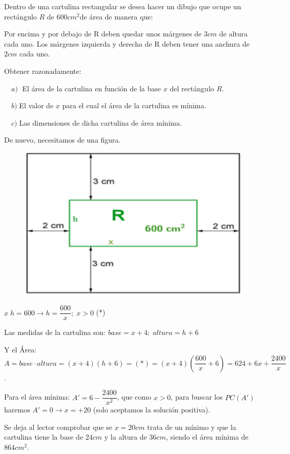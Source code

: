 	\begin{ejre} Dentro de una cartulina rectangular se desea hacer un dibujo que ocupe un rectángulo $R$ de $600 cm^2$de área de manera que:
	

		Por encima y por debajo de R deben quedar unos márgenes de $3 cm$ de altura cada uno. Los márgenes izquierda y derecha de R deben tener una anchura de $2 cm$ cada uno.
		
	Obtener razonadamente:
	
	
 	$\quad a)\; $ El área de la cartulina en función de la base $x$ del rectángulo $R$.
 	
 
 	 
 	 $\quad b)\; $El valor de $x$ para el cual el área de la cartulina es mínima. 
 	
 	$\quad c)\; $Las dimensiones de dicha cartulina de área mínima.
	 
	 
	  	
	\end{ejre}

	\begin{proofw}\renewcommand{\qedsymbol}{$\diamond$}
	
	De nuevo, necesitamos de una figura.
	
	\begin{multicols}{2}
	\begin{figure}[H]
	\centering
	\includegraphics[width=.4\textwidth]{imagenes/imagenes05/T05IM22.png}
	\end{figure}
	
	$x\; h=600 \to h=\dfrac {600} x; \; x>0$ (*)
	
	Las medidas de la cartulina son: $base=x+4; \; altura=h+6$
	
	Y el Área: $A=base\cdot altura= (x+4)(h+6)=(*)=(x+4)\left(\dfrac {600}{x}+6\right)= 624+6x+\dfrac {2400}{x}$.
	
		
	\end{multicols}

	Para el área mínima: $A'= 6-\dfrac{2400}{x^2}$, que como $x>0$, para buscar los $PC(A')$ haremos $A'=0 \to x=+20$ (solo aceptamos la solución positiva).
	
	Se deja al lector comprobar que se $x=20cm$ trata de un mínimo y que la cartulina tiene la base de $24cm$ y la altura de $36cm$, siendo el área mínima de $864cm^2$.
	\end{proofw}

